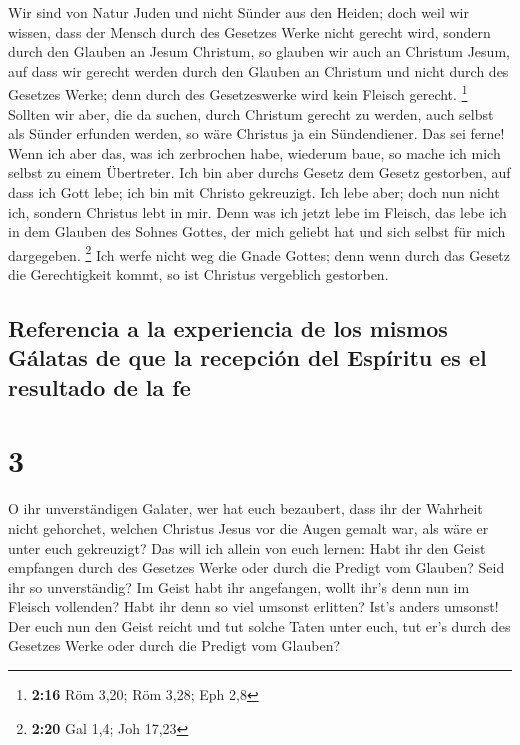  Wir sind von Natur Juden und nicht Sünder aus den
Heiden;  doch weil wir wissen, dass der Mensch durch des
Gesetzes Werke nicht gerecht wird, sondern durch den Glauben an Jesum
Christum, so glauben wir auch an Christum Jesum, auf dass wir gerecht
werden durch den Glauben an Christum und nicht durch des Gesetzes Werke;
denn durch des Gesetzeswerke wird kein Fleisch gerecht. \footnote{\textbf{2:16}
  Röm 3,20; Röm 3,28; Eph 2,8}  Sollten wir aber, die da
suchen, durch Christum gerecht zu werden, auch selbst als Sünder
erfunden werden, so wäre Christus ja ein Sündendiener. Das sei ferne!
 Wenn ich aber das, was ich zerbrochen habe, wiederum
baue, so mache ich mich selbst zu einem Übertreter.  Ich
bin aber durchs Gesetz dem Gesetz gestorben, auf dass ich Gott lebe; ich
bin mit Christo gekreuzigt.  Ich lebe aber; doch nun
nicht ich, sondern Christus lebt in mir. Denn was ich jetzt lebe im
Fleisch, das lebe ich in dem Glauben des Sohnes Gottes, der mich geliebt
hat und sich selbst für mich dargegeben. \footnote{\textbf{2:20} Gal
  1,4; Joh 17,23}  Ich werfe nicht weg die Gnade Gottes;
denn wenn durch das Gesetz die Gerechtigkeit kommt, so ist Christus
vergeblich gestorben.

\hypertarget{referencia-a-la-experiencia-de-los-mismos-guxe1latas-de-que-la-recepciuxf3n-del-espuxedritu-es-el-resultado-de-la-fe}{%
\subsection{Referencia a la experiencia de los mismos Gálatas de que la
recepción del Espíritu es el resultado de la
fe}\label{referencia-a-la-experiencia-de-los-mismos-guxe1latas-de-que-la-recepciuxf3n-del-espuxedritu-es-el-resultado-de-la-fe}}

\hypertarget{section-2}{%
\section{3}\label{section-2}}

 O ihr unverständigen Galater, wer hat euch bezaubert,
dass ihr der Wahrheit nicht gehorchet, welchen Christus Jesus vor die
Augen gemalt war, als wäre er unter euch gekreuzigt?  Das
will ich allein von euch lernen: Habt ihr den Geist empfangen durch des
Gesetzes Werke oder durch die Predigt vom Glauben?  Seid
ihr so unverständig? Im Geist habt ihr angefangen, wollt ihr's denn nun
im Fleisch vollenden?  Habt ihr denn so viel umsonst
erlitten? Ist's anders umsonst!  Der euch nun den Geist
reicht und tut solche Taten unter euch, tut er's durch des Gesetzes
Werke oder durch die Predigt vom Glauben?

